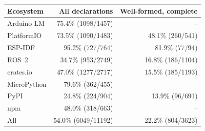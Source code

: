 \begin{tabular}{@{}lrr@{}}
\toprule
Ecosystem & All declarations & Well-formed, complete \\
\midrule
Arduino LM & 75.4\% (1098/1457) & -- \\
PlatformIO & 73.5\% (1090/1483) & 48.1\% (260/541) \\
ESP-IDF & 95.2\% (727/764) & 81.9\% (77/94) \\
ROS~2 & 34.7\% (953/2749) & 16.8\% (186/1104) \\
crates.io & 47.0\% (1277/2717) & 15.5\% (185/1193) \\
MicroPython & 79.6\% (362/455) & -- \\
PyPI & 24.8\% (224/904) & 13.9\% (96/691) \\
npm & 48.0\% (318/663) & -- \\
\midrule
All & 54.0\% (6049/11192) & 22.2\% (804/3623) \\
\bottomrule
\end{tabular}
